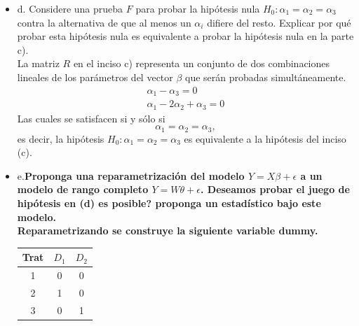 \documentclass[12pt,a4paper]{report}
\begin{document}
\begin{itemize}
\begin{enumerate}
\[(\underline{0})^t [R(X^tX)^{-}R^t]^{-1}(\underline{0})/2\sigma^2 = 0\] lo cual implica que la distribución del estadístico de prueba
se vuelve F central.
\end{enumerate}


\item d. Considere una prueba $F$ para probar la hipótesis nula $H_0:\alpha_1 =\alpha_2 =\alpha_3$ contra la alternativa de que al menos un $\alpha_i$ difiere del resto. Explicar por qué probar esta hipótesis nula es equivalente a probar la hipótesis nula en la parte c).\\
La matriz $R$ en el inciso c) representa un conjunto de dos combinaciones lineales de los parámetros del vector $\beta $ que serán probadas simultáneamente.\\

\begin{eqnarray}
\alpha_1 - \alpha_3 = 0 \\
\alpha_1 - 2\alpha_2 + \alpha_3 = 0
\end{eqnarray}
Las cuales se satisfacen si y sólo si 
$$\alpha_1 =\alpha_2 =\alpha_3,$$
es decir, la hipótesis
$H_0:\alpha_1 =\alpha_2 =\alpha_3$ 
es equivalente a la hipótesis del inciso (c).
\item e.\bf Proponga una reparametrización del modelo $Y = X\beta + \epsilon$ a un modelo de rango completo $Y = W\theta + \epsilon$. Deseamos probar el juego de hipótesis en (d) es posible? proponga un estadístico bajo este modelo.\\
Reparametrizando se construye la siguiente variable dummy.
\begin{center}
\begin{tabular}{| c | c | c |}
\hline
Trat & $D_1$ & $D_2$\\ \hline
1 & 0 & 0 \\
2 & 1 & 0 \\
3 & 0 & 1 \\ \hline
\end{tabular}
\end{center}


\end{itemize}
\end{document}
